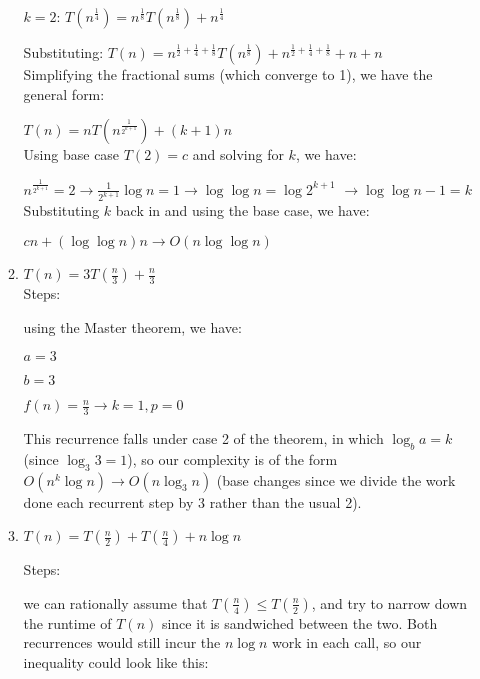 \documentclass[12pt]{article}
\begin{document}
\begin{enumerate}
\begin{enumerate}
        $k = 2$: $T(n^\frac{1}{4}) = n^\frac{1}{8}T(n^\frac{1}{8}) + n^\frac{1}{4}$

        Substituting: $T(n) = n^{\frac{1}{2} + \frac{1}{4} + \frac{1}{8}}T(n^\frac{1}{8}) + n^{\frac{1}{2} + \frac{1}{4} + \frac{1}{8}} + n + n$\\

        Simplifying the fractional sums (which converge to 1), we have the general form:

        $T(n) = nT(n^\frac{1}{2^{k + 1}}) + (k + 1)n$\\

        Using base case $T(2) = c$ and solving for $k$, we have:

        $n^\frac{1}{2^{k + 1}} = 2 \longrightarrow \frac{1}{2^{k + 1}}\log n = 1 \longrightarrow \log\log n = \log2^{k + 1}$
        $\longrightarrow \log\log n - 1 = k$\\

        Substituting $k$ back in and using the base case, we have:

        $cn + (\log\log n)n \longrightarrow O(n\log\log n)$\\
        
        \item $T(n) = 3T(\frac{n}{3}) + \frac{n}{3}$ \\
        
        Steps:
        
        using the Master theorem, we have:
        
        $a = 3$
        
        $b = 3$
        
        $f(n) = \frac{n}{3} \longrightarrow k = 1, p = 0$
        
        This recurrence falls under case 2 of the theorem, in which $\log_{b}{a} = k$ (since $\log_{3}{3} = 1$), so our 
        complexity is of the form $O(n^k \log n) \longrightarrow O(n\log_{3}{n})$ (base changes since we divide the work 
        done each recurrent step by 3 rather than the usual 2).\\
        
        \item $T(n) = T(\frac{n}{2}) + T(\frac{n}{4}) + n\log n$
        
        Steps:

        we can rationally assume that $T(\frac{n}{4}) \leq T(\frac{n}{2})$, and try to narrow down the 
        runtime of $T(n)$ since it is sandwiched between the two. Both recurrences would still incur the 
        $n\log n$ work in each call, so our inequality could look like this:


\end{enumerate}
\end{enumerate}
\end{document}

